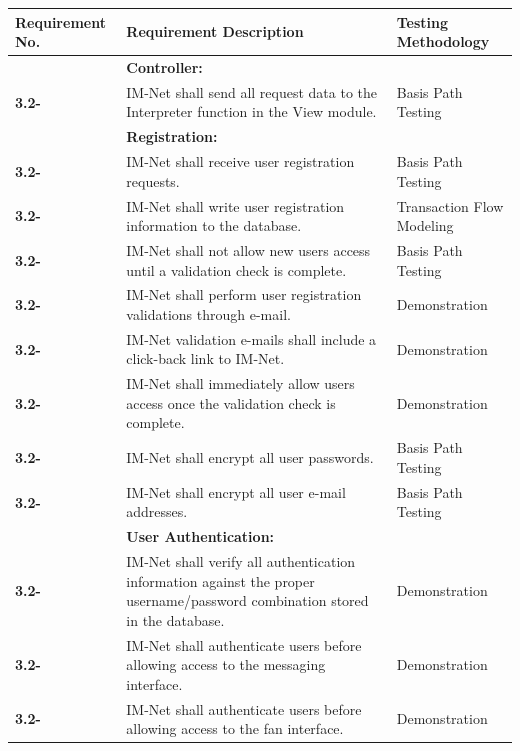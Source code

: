 \documentclass[letterpaper,12pt]{article}
\newcounter{rcounter}							%
\newcommand\rnumber{\stepcounter{rcounter}\arabic{rcounter}}
\begin{document}
{\begin{center}
\begin{tabular}{|l|p{4in}|p{2in}|}
\end{tabular} 
\end{center}

\setcounter{rcounter}{0}
\begin{center}
\begin{tabular}{|l|p{4in}|p{2in}|}
\hline 
Requirement No. & Requirement Description & Testing Methodology \\ 
\hline
& \textbf{Controller:} & \\
\hline
\textbf{3.2-\rnumber} & IM-Net shall send all request data to the Interpreter function in the View module. & Basis Path Testing \\
\hline 
& \textbf{Registration:} & \\
\hline
\textbf{3.2-\rnumber} & IM-Net shall receive user registration requests. & Basis Path Testing \\
\hline 
\textbf{3.2-\rnumber} & IM-Net shall write user registration information to the database. & Transaction Flow Modeling\\ 
\hline 
\textbf{3.2-\rnumber} & IM-Net shall not allow new users access until a validation check is complete. & Basis Path Testing \\ 
\hline 
\textbf{3.2-\rnumber} & IM-Net shall perform user registration validations through e-mail. & Demonstration \\
\hline 
\textbf{3.2-\rnumber} & IM-Net validation e-mails shall include a click-back link to IM-Net. & Demonstration \\ 
\hline 
\textbf{3.2-\rnumber} & IM-Net shall immediately allow users access once the validation check is complete. & Demonstration \\ 
\hline 
\textbf{3.2-\rnumber} & IM-Net shall encrypt all user passwords. & Basis Path Testing \\ 
\hline 
\textbf{3.2-\rnumber} & IM-Net shall encrypt all user e-mail addresses. & Basis Path Testing \\
\hline 
& \textbf{User Authentication:} & \\
\hline
\textbf{3.2-\rnumber} & IM-Net shall verify all authentication information against the proper username/password combination stored in the database. & Demonstration \\ 
\hline 
\textbf{3.2-\rnumber} & IM-Net shall authenticate users before allowing access to the messaging interface. & Demonstration \\ 
\hline 
\textbf{3.2-\rnumber} & IM-Net shall authenticate users before allowing access to the fan interface. & Demonstration \\ 

\end{tabular}
\end{center}}
\end{document}
